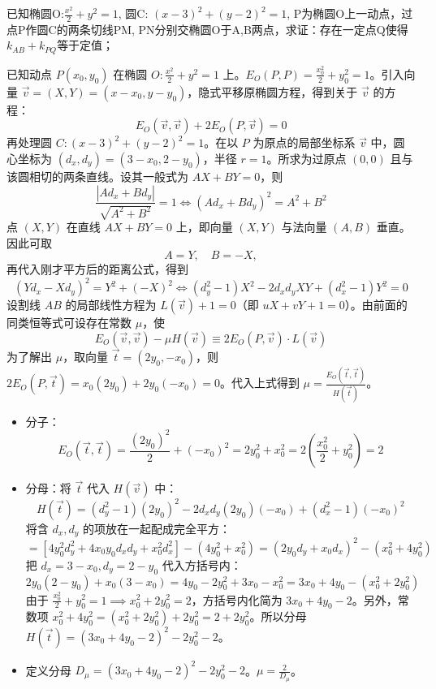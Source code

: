 \begin{exercise}
已知椭圆O:$\frac{x^{2}}{2}+y^{2}=1$, 圆C: $(x-3)^{2}+(y-2)^{2}=1$, P为椭圆O上一动点，过点P作圆C的两条切线PM, PN分别交椭圆O于A,B两点，求证：存在一定点Q使得$k_{AB}+k_{PQ}$等于定值；
\end{exercise}
\begin{solution}
已知动点 $P(x_0, y_0)$ 在椭圆 $O: \frac{x^2}{2} + y^2 = 1$ 上。$E_O(P,P) = \frac{x_0^2}{2} + y_0^2 = 1$。引入向量 $\vec{v} = (X, Y) = (x-x_0, y-y_0)$，隐式平移原椭圆方程，得到关于 $\vec{v}$ 的方程：$$E_O(\vec{v}, \vec{v}) + 2E_O(P, \vec{v}) = 0$$
再处理圆 $C: (x-3)^2 + (y-2)^2 = 1$。在以 $P$ 为原点的局部坐标系 $\vec{v}$ 中，圆心坐标为 $(d_x, d_y) = (3-x_0, 2-y_0)$，半径 $r = 1$。所求为过原点 $(0,0)$ 且与该圆相切的两条直线。设其一般式为 $AX + BY = 0$，则
\[\frac{|A d_x + B d_y|}{\sqrt{A^2 + B^2}} = 1\Leftrightarrow (A d_x + B d_y)^2 = A^2 + B^2\]
点 $(X, Y)$ 在直线 $AX + BY = 0$ 上，即向量 $(X, Y)$ 与法向量 $(A, B)$ 垂直。因此可取
$$A = Y, \quad B = -X,$$
再代入刚才平方后的距离公式，得到
$$(Y d_x - X d_y)^2 = Y^2 + (-X)^2\Leftrightarrow(d_y^2 - 1)X^2 - 2d_x d_y XY + (d_x^2 - 1)Y^2 = 0$$
设割线 $AB$ 的局部线性方程为 $L(\vec{v}) + 1 = 0$（即 $uX + vY + 1 = 0$）。由前面的同类恒等式可设存在常数 $\mu$，使
$$E_O(\vec{v}, \vec{v}) - \mu H(\vec{v}) \equiv 2E_O(P, \vec{v}) \cdot L(\vec{v})$$
为了解出 $\mu$，取向量 $\vec{t} = (2y_0, -x_0)$，则 $2E_O(P, \vec{t}) = x_0(2y_0) + 2y_0(-x_0) = 0$。代入上式得到 $\mu = \frac{E_O(\vec{t}, \vec{t})}{H(\vec{t})}$。
\begin{itemize}
\item 分子：$$E_O(\vec{t}, \vec{t}) = \frac{(2y_0)^2}{2} + (-x_0)^2 = 2y_0^2 + x_0^2 = 2\left(\frac{x_0^2}{2} + y_0^2\right) =  2$$
\item 分母：将 $\vec{t}$ 代入 $H(\vec{v})$ 中：$$H(\vec{t}) = (d_y^2 - 1)(2y_0)^2 - 2d_x d_y (2y_0)(-x_0) + (d_x^2 - 1)(-x_0)^2$$将含 $d_x, d_y$ 的项放在一起配成完全平方：$$= [4y_0^2 d_y^2 + 4x_0 y_0 d_x d_y + x_0^2 d_x^2] - (4y_0^2 + x_0^2) = (2y_0 d_y + x_0 d_x)^2 - (x_0^2 + 4y_0^2)$$把 $d_x = 3-x_0, d_y = 2-y_0$ 代入方括号内：$$2y_0(2-y_0) + x_0(3-x_0) = 4y_0 - 2y_0^2 + 3x_0 - x_0^2 = 3x_0 + 4y_0 - (x_0^2 + 2y_0^2)$$由于 $\frac{x_0^2}{2} + y_0^2 = 1 \implies x_0^2 + 2y_0^2 = 2$，方括号内化简为 $3x_0 + 4y_0 - 2$。另外，常数项 $x_0^2 + 4y_0^2 = (x_0^2 + 2y_0^2) + 2y_0^2 = 2 + 2y_0^2$。所以分母 $H(\vec{t}) = (3x_0 + 4y_0 - 2)^2 - 2y_0^2 - 2$。
\item 定义分母 $D_\mu = (3x_0 + 4y_0 - 2)^2 - 2y_0^2 - 2$。$\mu = \frac{2}{D_\mu}$。
\end{itemize}

\end{solution}
